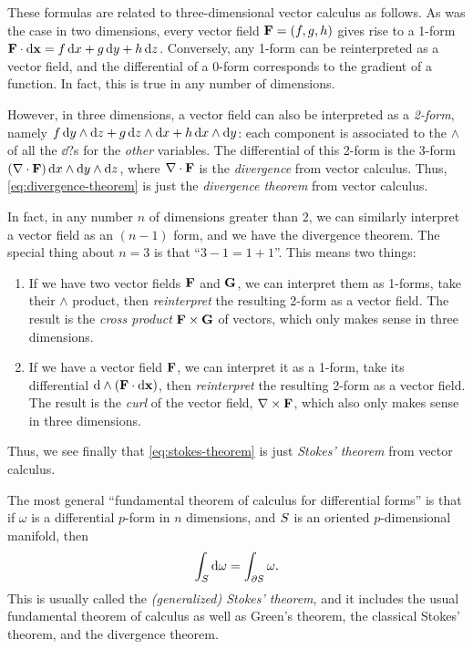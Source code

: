 \documentclass[12pt]{amsart}
\begin{document}
These formulas are related to three-dimensional vector calculus as follows.
As was the case in two dimensions, every vector field $\mathbf{F}=(f,g,h)$ gives rise to a 1-form $\mathbf{F} \cdot {\ensuremath{\mathrm{d} \mathbf{x}}} = f\,{\mathrm{d} x} + g\,{\mathrm{d} y} + h\,{\mathrm{d} z}$.
Conversely, any 1-form can be reinterpreted as a vector field, and the differential of a 0-form corresponds to the gradient of a function.
In fact, this is true in any number of dimensions.

However, in three dimensions, a vector field can also be interpreted as a \emph{2-form}, namely $f\,{\mathrm{d} y}\wedge{\ensuremath{\mathrm{d} z}} + g \,{\mathrm{d} z}\wedge{\ensuremath{\mathrm{d} x}} + h \,{\mathrm{d} x}\wedge{\ensuremath{\mathrm{d} y}}$: each component is associated to the $\wedge$ of all the $\dd?$s for the \emph{other} variables.
The differential of this 2-form is the 3-form $(\nabla \cdot \mathbf{F})\,{\mathrm{d} x}\wedge{\ensuremath{\mathrm{d} y}}\wedge{\ensuremath{\mathrm{d} z}}$, where $\nabla \cdot \mathbf{F}$ is the \emph{divergence} from vector calculus.
Thus, \cref{eq:divergence-theorem} is just the \emph{divergence theorem} from vector calculus.

In fact, in any number $n$ of dimensions greater than $2$, we can similarly interpret a vector field as an $(n-1)$ form, and we have the divergence theorem.
The special thing about $n=3$ is that ``$3-1 = 1+1$''.
This means two things:
\begin{enumerate}
\item If we have two vector fields $\mathbf{F}$ and $\mathbf{G}$, we can interpret them as 1-forms, take their $\wedge$ product, then \emph{reinterpret} the resulting 2-form as a vector field.
  The result is the \emph{cross product} $\mathbf{F} \times \mathbf{G}$ of vectors, which only makes sense in three dimensions.
\item If we have a vector field $\mathbf{F}$, we can interpret it as a 1-form, take its differential $\mathrm{d}\wedge(\mathbf{F} \cdot {\ensuremath{\mathrm{d} \mathbf{x}}})$, then \emph{reinterpret} the resulting 2-form as a vector field.
  The result is the \emph{curl} of the vector field, $\nabla \times \mathbf{F}$, which also only makes sense in three dimensions.
\end{enumerate}
Thus, we see finally that \cref{eq:stokes-theorem} is just \emph{Stokes' theorem} from vector calculus.

The most general ``fundamental theorem of calculus for differential forms'' is that if $\omega$ is a differential $p$-form in $n$ dimensions, and $S$ is an oriented $p$-dimensional manifold, then
\[ \int_{S} \mathrm{d}\omega = \int_{\partial S} \omega. \]
This is usually called the \emph{(generalized) Stokes' theorem}, and it includes the usual fundamental theorem of calculus as well as Green's theorem, the classical Stokes' theorem, and the divergence theorem.
\end{document}

